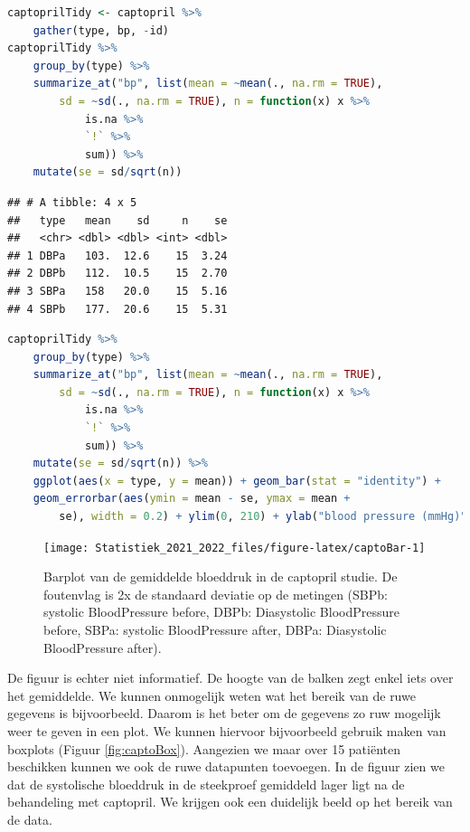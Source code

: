 \documentclass[
  12pt,dutch,coursenotes]{book}
\theoremstyle{definition}
\theoremstyle{definition}
\theoremstyle{definition}
\theoremstyle{definition}
\theoremstyle{remark}
\begin{document}
\begin{lstlisting}[language=R]
captoprilTidy <- captopril %>%
    gather(type, bp, -id)
captoprilTidy %>%
    group_by(type) %>%
    summarize_at("bp", list(mean = ~mean(., na.rm = TRUE),
        sd = ~sd(., na.rm = TRUE), n = function(x) x %>%
            is.na %>%
            `!` %>%
            sum)) %>%
    mutate(se = sd/sqrt(n))
\end{lstlisting}

\begin{lstlisting}
## # A tibble: 4 x 5
##   type   mean    sd     n    se
##   <chr> <dbl> <dbl> <int> <dbl>
## 1 DBPa   103.  12.6    15  3.24
## 2 DBPb   112.  10.5    15  2.70
## 3 SBPa   158   20.0    15  5.16
## 4 SBPb   177.  20.6    15  5.31
\end{lstlisting}

\begin{lstlisting}[language=R]
captoprilTidy %>%
    group_by(type) %>%
    summarize_at("bp", list(mean = ~mean(., na.rm = TRUE),
        sd = ~sd(., na.rm = TRUE), n = function(x) x %>%
            is.na %>%
            `!` %>%
            sum)) %>%
    mutate(se = sd/sqrt(n)) %>%
    ggplot(aes(x = type, y = mean)) + geom_bar(stat = "identity") +
    geom_errorbar(aes(ymin = mean - se, ymax = mean +
        se), width = 0.2) + ylim(0, 210) + ylab("blood pressure (mmHg)")
\end{lstlisting}

\begin{figure}

{\centering \texttt{[image: Statistiek\_2021\_2022\_files/figure-latex/captoBar-1]} 

}

\caption{Barplot van de gemiddelde bloeddruk in de captopril studie. De foutenvlag is 2x de standaard deviatie op de metingen (SBPb: systolic BloodPressure before, DBPb: Diasystolic BloodPressure before, SBPa: systolic BloodPressure after, DBPa: Diasystolic BloodPressure after).}\label{fig:captoBar}
\end{figure}

De figuur is echter niet informatief.
De hoogte van de balken zegt enkel iets over het gemiddelde.
We kunnen onmogelijk weten wat het bereik van de ruwe gegevens is bijvoorbeeld.
Daarom is het beter om de gegevens zo ruw mogelijk weer te geven in een plot.
We kunnen hiervoor bijvoorbeeld gebruik maken van boxplots (Figuur \ref{fig:captoBox}).
Aangezien we maar over 15 patiënten beschikken kunnen we ook de ruwe datapunten toevoegen.
In de figuur zien we dat de systolische bloeddruk in de steekproef gemiddeld lager ligt na de behandeling met captopril.
We krijgen ook een duidelijk beeld op het bereik van de data.
\end{document}
